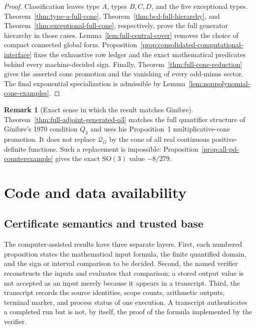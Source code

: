 \documentclass[11pt,reqno]{amsart}
\theoremstyle{plain}
\theoremstyle{definition}
\newtheorem{remark}[theorem]{Remark}
\newcommand{\Qcone}{\mathcal Q}
\begin{document}
\begin{proof}
Classification leaves type $A$, types $B,C,D$, and the five exceptional
types.  Theorem~\ref{thm:type-a-full-cone},
Theorem~\ref{thm:bcd-full-hierarchy}, and
Theorem~\ref{thm:exceptional-full-cone}, respectively, prove the full
generator hierarchy in those cases.  Lemma~\ref{lem:full-central-cover}
removes the choice of compact connected global form.
Proposition~\ref{prop:consolidated-computational-interface} fixes the
exhaustive row ledger and the exact mathematical predicates behind every
machine-decided sign.  Finally,
Theorem~\ref{thm:full-cone-reduction} gives the asserted cone promotion and
the vanishing of every odd-minus sector.  The final exponential specialization
is admissible by Lemma~\ref{lem:nonpolynomial-cone-examples}.
\end{proof}

\begin{remark}[Exact sense in which the result matches Ginibre]
Theorem~\ref{thm:full-adjoint-generated-q3} matches the full quantifier
structure of Ginibre's 1970 condition $Q_3$ and uses his Proposition~1
multiplicative-cone promotion.  It does not replace $\Qcone_G$ by the cone of
all real continuous positive-definite functions.  Such a replacement is
impossible: Proposition~\ref{prop:all-pd-counterexample} gives the exact
$\mathrm{SO}(3)$ value $-8/279$.
\end{remark}

\section{Code and data availability}
\label{sec:code-data-availability}

\subsection*{Certificate semantics and trusted base}

The computer-assisted results have three separate layers.  First, each
numbered proposition states the mathematical input formula, the finite
quantified domain, and the sign or interval comparison to be decided.  Second,
the named verifier reconstructs the inputs and evaluates that comparison; a
stored output value is not accepted as an input merely because it appears in a
transcript.  Third, the transcript records the source identities, scope
counts, arithmetic outputs, terminal marker, and process status of one
execution.  A transcript authenticates a completed run but is not, by itself,
the proof of the formula implemented by the verifier.
\end{document}

